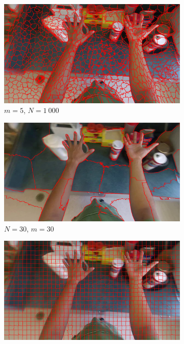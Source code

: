 \documentclass[12pt,a4paper,oneside]{article}
\begin{document}
\begin{figure}[p]
	\centering
	\begin{subfigure}[t]{.495\textwidth}
		\includegraphics[width=\textwidth]{resources/images/m_basso_5.png}
		\caption{$m = 5$, $N = 1~000$}\label{es_bad_superpixel_m_basso}
	\end{subfigure}%
	\hfill
	\begin{subfigure}[t]{.495\textwidth}
		\includegraphics[width=\textwidth]{resources/images/N_basso_30.png}
		\caption{$N = 30$, $m = 30$}\label{es_bad_superpixel_N_basso}
	\end{subfigure}%
	\vspace{.0033\textwidth}
	\begin{subfigure}[t]{.495\textwidth}
		\includegraphics[width=\textwidth]{resources/images/m_alto_1000.png}

\end{subfigure}
\end{figure}
\end{document}
